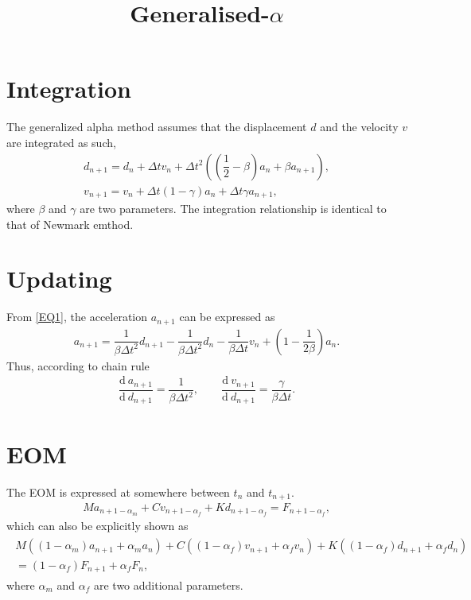 \documentclass[a4paper,10pt,fleqn]{article}
\newcommand{\ddfrac}[2]{\dfrac{\mathrm{d}~#1}{\mathrm{d}~#2}}
\begin{document}
\title{Generalised-$\alpha$}\date{}
\maketitle
\section{Integration}
The generalized alpha method assumes that the displacement $d$ and the velocity $v$ are integrated as such,
\begin{gather}\label{EQ1}
d_{n+1}=d_n+\Delta{}tv_n+\Delta{}t^2\left(\left(\dfrac{1}{2}-\beta\right)a_n+\beta{}a_{n+1}\right),\\
v_{n+1}=v_n+\Delta{}t\left(1-\gamma\right)a_n+\Delta{}t\gamma{}a_{n+1},
\end{gather}
where $\beta$ and $\gamma$ are two parameters. The integration relationship is identical to that of Newmark emthod.
\section{Updating}
From \eqref{EQ1}, the acceleration $a_{n+1}$ can be expressed as
\begin{gather}
a_{n+1}=\dfrac{1}{\beta\Delta{}t^2}d_{n+1}-\dfrac{1}{\beta\Delta{}t^2}d_n-\dfrac{1}{\beta\Delta{}t}v_n+\left(1-\dfrac{1}{2\beta}\right)a_n.
\end{gather}
Thus, according to chain rule
\begin{gather}
\ddfrac{a_{n+1}}{d_{n+1}}=\dfrac{1}{\beta\Delta{}t^2},\qquad{}\ddfrac{v_{n+1}}{d_{n+1}}=\dfrac{\gamma}{\beta\Delta{}t}.
\end{gather}
\section{EOM}
The EOM is expressed at somewhere between $t_n$ and $t_{n+1}$.
\begin{gather}
Ma_{n+1-\alpha_m}+Cv_{n+1-\alpha_f}+Kd_{n+1-\alpha_f}=F_{n+1-\alpha_f},
\end{gather}
which can also be explicitly shown as
\begin{gather}
\begin{split}
M\left(\left(1-\alpha_m\right)a_{n+1}+\alpha_ma_n\right)+C\left(\left(1-\alpha_f\right)v_{n+1}+\alpha_fv_n\right)+K\left(\left(1-\alpha_f\right)d_{n+1}+\alpha_fd_n\right)\\=\left(1-\alpha_f\right)F_{n+1}+\alpha_fF_n,
\end{split}
\end{gather}
where $\alpha_m$ and $\alpha_f$ are two additional parameters.
\end{document}
